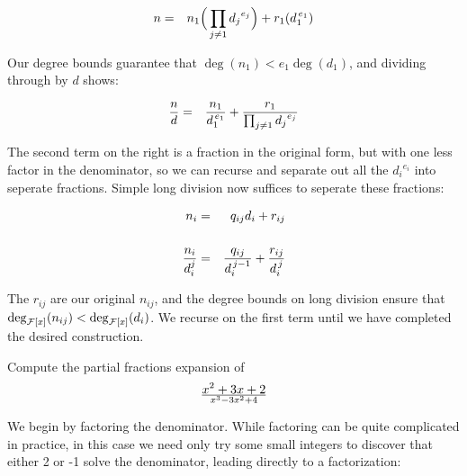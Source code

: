 \begin{eqnarray*}
n &=& n_1 \Big( \prod_{j\ne 1} {d_j}^{e_j} \Big) + r_1 (d_1^{\,e_1}) \cr
\end{eqnarray*}

Our degree bounds guarantee that
$\deg(n_1) < e_1\deg(d_1)$, and dividing through by $d$ shows:

\begin{eqnarray*}
{n\over d} &=& {{n_1}\over{d_1^{\,e_1}}} + {r_1\over{\prod_{j\ne 1} {d_j}^{e_j}}} \cr
\end{eqnarray*}

The second term on the right is a fraction in the original form,
but with one less factor in the denominator, so we can recurse
and separate out all the ${d_i}^{e_i}$ into seperate fractions.
Simple long division now suffices to seperate these fractions:

\begin{eqnarray*}
n_i &=& q_{ij} d_i + r_{ij} \cr\cr
{{n_i}\over{d_i^j}} &=& {{q_{ij}}\over{d_i^{\,j-1}}} + {r_{ij}\over{d_i^{\,j}}} \cr
\end{eqnarray*}

The $r_{ij}$ are our original $n_{ij}$, and the degree bounds on long
division ensure that $\deg_{{\cal F}[x]}(n_{ij}) < \deg_{{\cal F}[x]}(d_i)$.
We recurse on the first term until we have completed the desired construction.

\vfill\eject

\example

Compute the partial fractions expansion of $${x^2 + 3x + 2}\over{x^3-3x^2+4}$$

We begin by factoring the denominator.  While factoring can be quite
complicated in practice, in this case we need only try some small
integers to discover that either 2 or -1 solve the denominator,
leading directly to a factorization:

\begin{comment}
Differentiating to obtain $3x^2-6x$.
Computing the GCD of $x^3-3x^2+4$ and $3x^2-6x$:



Thus, $-2x+4$ is a GCD, which we normalize by dividing through by -2
to obtain $x-2$.  We could now proceed by dividing $x^3-3x^2+4$ by
$x-2$ to obtain $x^2-x-2$ (all factors at unit power), compute the GCD
of $x-2$ and $x^2-x-2$ to obtain $x-2$ (all higher factors at unit
power), divide $x^2-x-2$ by $x-2$ to obtain $x+1$ (the unit
square-free factor), and repeat the process (trivially) with $x-2$ to
decide that $x-2$ is the second square-free factor.  Or, we could
shortcut the entire process by noting that since $x-2$ is linear,
it can only be the second square-free factor.  In any event, we conclude that:

\end{comment}

